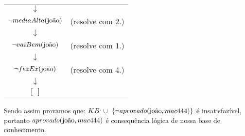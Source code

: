 \documentclass[12pt]{article}
\begin{document}
\begin{itemize}
\begin{center}
\begin{tabular}{c c}
					$\downarrow$ & \\
					$\neg mediaAlta(\textnormal{joão})$ & (resolve com 2.)\\
					$\downarrow$ & \\
					$\neg vaiBem(\textnormal{joão})$ & (resolve com 1.)\\
					$\downarrow$ & \\
					$\neg fezEx(\textnormal{joão})$ & (resolve com 4.)\\
					$\downarrow$ & \\
					$[ \ ]$ & \\
				\end{tabular}
			\end{center}
			Sendo assim provamos que: $KB \ \cup \  \{ \neg aprovado(\textnormal{joão}, 
			mac444) \}$ é insatisfazível, portanto $aprovado(\textnormal{joão}, mac444)$  
			é consequência lógica de nossa base de conhecimento.\\
	\end{itemize}
\end{document}
